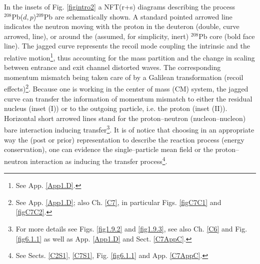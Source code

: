 In the insets of Fig. \ref{figintro2} a NFT(r+s)  diagrams describing the process\\ \mbox{$^{208}$Pb($d,p$)$^{209}$Pb} are schematically shown. A standard pointed arrowed line indicates the neutron moving with the proton in the deuteron (double, curve arrowed, line), or around the (assumed, for simplicity, inert) $^{208}$Pb core (bold face line). The jagged curve represents the recoil  mode coupling the intrinsic and the relative motion\footnote{See App. \ref{App1.D}.},  thus accounting for the mass partition  and the change in scaling between entrance and exit channel distorted waves. The corresponding momentum mismatch being taken care of by a  Galilean transformation (recoil effects)\footnote{See App. \ref{App1.D}; also Ch. \ref{C7}, in particular Figs. \ref{figC7C1} and \ref{figC7C2}.}. Because one is working in the center of mass (CM) system, the jagged curve can transfer the information of momentum mismatch to either the residual nucleus (inset (I)) or to the outgoing particle, i.e. the proton (inset (II)).  Horizontal short arrowed lines stand for the proton--neutron (nucleon--nucleon) bare interaction inducing transfer\footnote{For more details see  Figs.  \ref{fig1.9.2} and \ref{fig1.9.3}, see also Ch. \ref{C6} and Fig. \ref{fig6.1.1} as well as App. \ref{App1.D} and Sect. \ref{C7AppC}.}. It is of notice that choosing in an appropriate way the (post or prior) representation to describe the reaction process (energy conservation), one can evidence the single--particle mean field or the proton--neutron interaction as inducing the transfer process\footnote{See Sects. \ref{C2S1}, \ref{C7S1}, Fig. \ref{fig6.1.1} and App. \ref{C7AppC}.}.


